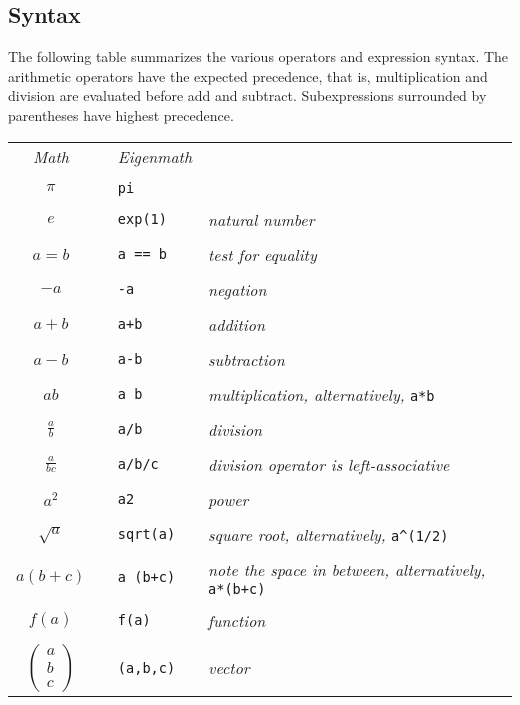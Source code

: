 \subsection{Syntax}
The following table summarizes the various operators and expression syntax.
The arithmetic operators have the expected precedence, that is,
multiplication and division are evaluated before add and subtract.
Subexpressions surrounded by parentheses have highest precedence.

\begin{center}
\begin{tabular}{clll}
{\it Math} & & {\it Eigenmath} & \\
\\
$\pi$ & & {\tt pi} & \\
\\
$e$ && {\tt exp(1)} & {\it natural number} \\
\\
$a=b$ & & \verb$a == b$ & {\it test for equality} \\
\\
$-a$ & & {\tt -a} & {\it negation} \\
\\
$a+b$ & & {\tt a+b} & {\it addition} \\
\\
$a-b$ & & {\tt a-b} & {\it subtraction} \\
\\
$ab$ & & {\tt a b} & {\it multiplication, alternatively,} \verb$a*b$ \\
\\
$\displaystyle\frac{a}{b}$ & & {\tt a/b} & {\it division}\\
\\
$\displaystyle\frac{a}{bc}$ & & {\tt a/b/c} & {\it division operator is left-associative} \\
\\
$a^2$ & & {\tt a{\char94}2} & {\it power}\\
\\
$\sqrt{a}$ & & \verb$sqrt(a)$ & {\it square root, alternatively,} \verb$a^(1/2)$ \\
\\
$a(b+c)$ & & {\tt a (b+c)} & {\it note the space in between, alternatively,} \verb$a*(b+c)$ \\
\\
$f(a)$ & & {\tt f(a)} & {\it function} \\
\\
$\begin{pmatrix}a\\ b\\ c\end{pmatrix}$ & & {\tt (a,b,c)} & {\it vector} \\

\end{tabular}
\end{center}
